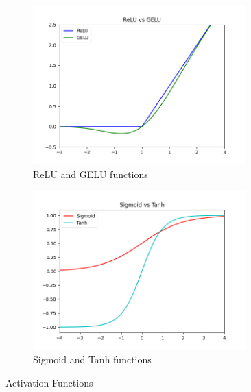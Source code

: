 \begin{figure}
	\begin{subfigure}{.5\textwidth}
		\centering
		\includegraphics[width=0.9\textwidth]{figures/ml_theory/relu_gelu.png}
		\caption{ReLU and GELU functions}
		\label{fig:relu_gelu}
	\end{subfigure}
	\begin{subfigure}{.5\textwidth}
		\centering
		\includegraphics[width=0.9\textwidth]{figures/ml_theory/sigmoid_tanh.png}
		\caption{Sigmoid and Tanh functions}
		\label{fig:sigmoid_tanh}
	\end{subfigure}
	\caption{Activation Functions}
	\label{fig:activation_functions}
\end{figure}
